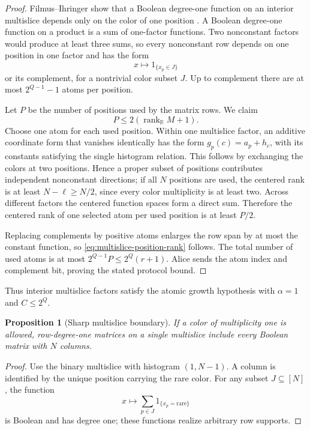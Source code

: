 \documentclass[11pt]{article}
\newtheorem{proposition}[theorem]{Proposition}
\theoremstyle{definition}
\theoremstyle{remark}
\newcommand{\R}{\mathbb R}
\newcommand{\1}{\mathbf 1}
\newcommand{\rank}{\operatorname{rank}}
\begin{document}
\begin{proof}
Filmus--Ihringer show that a Boolean degree-one function on an interior
multislice depends only on the color of one position
\cite[Lemma~8.1]{FilmusIhringer}.  A Boolean degree-one function on a product
is a sum of one-factor functions.  Two nonconstant factors would produce at
least three sums, so every nonconstant row depends on one position in one
factor and has the form
\[
 x\longmapsto1_{\{x_p\in J\}}
\]
or its complement, for a nontrivial color subset $J$.  Up to complement there
are at most $2^{Q-1}-1$ atoms per position.

Let $P$ be the number of positions used by the matrix rows.  We claim
\begin{equation}\label{eq:multislice-position-rank}
 P\le2(\rank_{\R}M+1).
\end{equation}
Choose one atom for each used position.  Within one multislice factor, an
additive coordinate form that vanishes identically has the form
$g_p(c)=a_p+h_c$, with its constants satisfying the single histogram
relation.  This follows by exchanging the colors at two positions.  Hence a
proper subset of positions contributes independent nonconstant directions;
if all $N$ positions are used, the centered rank is at least
$N-\ell\ge N/2$, since every color multiplicity is at least two.  Across
different factors the centered function spaces form a direct sum.  Therefore
the centered rank of one selected atom per used position is at least $P/2$.

Replacing complements by positive atoms enlarges the row span by at most the
constant function, so \eqref{eq:multislice-position-rank} follows.  The total
number of used atoms is at most $2^{Q-1}P\le2^Q(r+1)$.  Alice sends the atom
index and complement bit, proving the stated protocol bound.
\end{proof}

Thus interior multislice factors satisfy the atomic growth hypothesis with
$\alpha=1$ and $C\le2^Q$.

\begin{proposition}[Sharp multislice boundary]
If a color of multiplicity one is allowed, row-degree-one matrices on a
single multislice include every Boolean matrix with $N$ columns.
\end{proposition}

\begin{proof}
Use the binary multislice with histogram $(1,N-1)$.  A column is identified
by the unique position carrying the rare color.  For any subset
$J\subseteq[N]$, the function
\[
 x\longmapsto\sum_{p\in J}1_{\{x_p=\text{rare}\}}
\]
is Boolean and has degree one; these functions realize arbitrary row
supports.
\end{proof}
\end{document}
